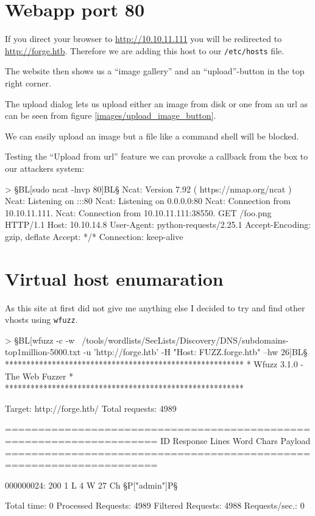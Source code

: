 \section{Webapp port 80}
If you direct your browser to \url{http://10.10.11.111} you will be redirected to \url{http://forge.htb}. Therefore we are adding this host to our \texttt{/etc/hosts} file.


The website then shows us a \enquote{image gallery} and an \enquote{upload}-button in the top right corner.


The upload dialog lets us upload either an image from disk or one from an url as can be seen from figure \vref{images/upload_image_button}.


We can easily upload an image but a file like a command shell will be blocked.

Testing the \enquote{Upload from url} feature we can provoke a callback from the box to our attackers system:

\begin{wulisting}[caption=connection test]
> §BL[sudo ncat -lnvp 80]BL§
Ncat: Version 7.92 ( https://nmap.org/ncat )
Ncat: Listening on :::80
Ncat: Listening on 0.0.0.0:80
Ncat: Connection from 10.10.11.111.
Ncat: Connection from 10.10.11.111:38550.
GET /foo.png HTTP/1.1
Host: 10.10.14.8
User-Agent: python-requests/2.25.1
Accept-Encoding: gzip, deflate
Accept: */*
Connection: keep-alive
\end{wulisting}

\section{Virtual host enumaration}
As this site at first did not give me anything else I decided to try and find other vhosts using \texttt{wfuzz}.

\begin{wulisting}[caption=wfuzz vhost enumeration]
> §BL[wfuzz -c -w ~/tools/wordlists/SecLists/Discovery/DNS/subdomains-top1million-5000.txt -u 'http://forge.htb' -H "Host: FUZZ.forge.htb" --hw 26]BL§
********************************************************
* Wfuzz 3.1.0 - The Web Fuzzer                         *
********************************************************

Target: http://forge.htb/
Total requests: 4989

=====================================================================
ID           Response   Lines    Word       Chars       Payload
=====================================================================

000000024:   200        1 L      4 W        27 Ch       §P["admin"]P§

Total time: 0
Processed Requests: 4989
Filtered Requests: 4988
Requests/sec.: 0
\end{wulisting}

